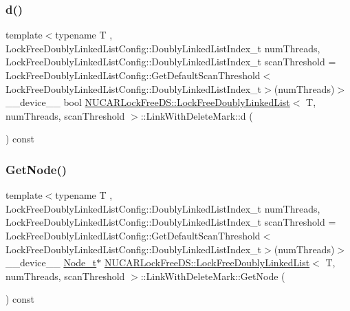 \subsubsection{\texorpdfstring{d()}{d()}}
{\footnotesize\ttfamily template$<$typename T , Lock\+Free\+Doubly\+Linked\+List\+Config\+::\+Doubly\+Linked\+List\+Index\+\_\+t num\+Threads, Lock\+Free\+Doubly\+Linked\+List\+Config\+::\+Doubly\+Linked\+List\+Index\+\_\+t scan\+Threshold = Lock\+Free\+Doubly\+Linked\+List\+Config\+::\+Get\+Default\+Scan\+Threshold$<$\+Lock\+Free\+Doubly\+Linked\+List\+Config\+::\+Doubly\+Linked\+List\+Index\+\_\+t$>$(num\+Threads)$>$ \\
\+\_\+\+\_\+device\+\_\+\+\_\+ bool \mbox{\hyperlink{class_n_u_c_a_r_lock_free_d_s_1_1_lock_free_doubly_linked_list}{N\+U\+C\+A\+R\+Lock\+Free\+D\+S\+::\+Lock\+Free\+Doubly\+Linked\+List}}$<$ T, num\+Threads, scan\+Threshold $>$\+::Link\+With\+Delete\+Mark\+::d (\begin{DoxyParamCaption}{ }\end{DoxyParamCaption}) const\hspace{0.3cm}{\ttfamily [inline]}}

\mbox{\label{class_n_u_c_a_r_lock_free_d_s_1_1_lock_free_doubly_linked_list_1_1_link_with_delete_mark_a3f9ae9e135b17122984dbf716b46b951}} 
\subsubsection{\texorpdfstring{Get\+Node()}{GetNode()}}
{\footnotesize\ttfamily template$<$typename T , Lock\+Free\+Doubly\+Linked\+List\+Config\+::\+Doubly\+Linked\+List\+Index\+\_\+t num\+Threads, Lock\+Free\+Doubly\+Linked\+List\+Config\+::\+Doubly\+Linked\+List\+Index\+\_\+t scan\+Threshold = Lock\+Free\+Doubly\+Linked\+List\+Config\+::\+Get\+Default\+Scan\+Threshold$<$\+Lock\+Free\+Doubly\+Linked\+List\+Config\+::\+Doubly\+Linked\+List\+Index\+\_\+t$>$(num\+Threads)$>$ \\
\+\_\+\+\_\+device\+\_\+\+\_\+ \mbox{\hyperlink{class_n_u_c_a_r_lock_free_d_s_1_1_lock_free_doubly_linked_list_abb8fd1da564d74028552e980bc99a704}{Node\+\_\+t}}$\ast$ \mbox{\hyperlink{class_n_u_c_a_r_lock_free_d_s_1_1_lock_free_doubly_linked_list}{N\+U\+C\+A\+R\+Lock\+Free\+D\+S\+::\+Lock\+Free\+Doubly\+Linked\+List}}$<$ T, num\+Threads, scan\+Threshold $>$\+::Link\+With\+Delete\+Mark\+::\+Get\+Node (\begin{DoxyParamCaption}{ }\end{DoxyParamCaption}) const\hspace{0.3cm}{\ttfamily [inline]}}

